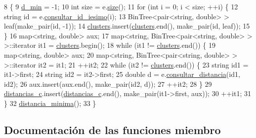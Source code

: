 \begin{DoxyCode}
8                                                 \{
9   \hyperlink{class_cjt___clusters_a1b94b5f25778ee95796a9be966f1c619}{d\_min} = -1;
10   \textcolor{keywordtype}{int} size = e.\hyperlink{class_cjt___especies_a7061cb2108f9be2b12b8f2c5ae99a82d}{size}();
11   \textcolor{keywordflow}{for} (\textcolor{keywordtype}{int} i = 0; i < size; ++i) \{
12     \textcolor{keywordtype}{string} \textcolor{keywordtype}{id} = e.\hyperlink{class_cjt___especies_a0cc233873c53e5120cd362de7821eb16}{consultar\_id\_iesimo}(i);
13     BinTree<pair<string, double> > leaf(make\_pair(\textcolor{keywordtype}{id}, -1));
14     \hyperlink{class_cjt___clusters_a866c5a14f8f50598be2af9fd8c115dd2}{clusters}.insert(\hyperlink{class_cjt___clusters_a866c5a14f8f50598be2af9fd8c115dd2}{clusters}.end(), make\_pair(\textcolor{keywordtype}{id}, leaf));
15   \}
16   map<string, double> aux;
17   map<string, BinTree<pair<string, double> > >::iterator it1 = \hyperlink{class_cjt___clusters_a866c5a14f8f50598be2af9fd8c115dd2}{clusters}.begin();
18   \textcolor{keywordflow}{while} (it1 != \hyperlink{class_cjt___clusters_a866c5a14f8f50598be2af9fd8c115dd2}{clusters}.end()) \{
19     map<string, double> aux;
20     map<string, BinTree<pair<string, double> > >::iterator it2 = it1;
21     ++it2;
22     \textcolor{keywordflow}{while} (it2 != \hyperlink{class_cjt___clusters_a866c5a14f8f50598be2af9fd8c115dd2}{clusters}.end()) \{
23       \textcolor{keywordtype}{string} id1 = it1->first;
24       \textcolor{keywordtype}{string} id2 = it2->first;
25       \textcolor{keywordtype}{double} d = e.\hyperlink{class_cjt___especies_a55f41bd03feccf515a491abca95bd60f}{consultar\_distancia}(id1, id2);
26       aux.insert(aux.end(), make\_pair(id2, d));
27       ++it2;
28     \}
29     \hyperlink{class_cjt___clusters_a2b912c7987fd370bdeaf5dabb966240f}{distancias\_c}.insert(\hyperlink{class_cjt___clusters_a2b912c7987fd370bdeaf5dabb966240f}{distancias\_c}.end(), make\_pair(it1->first, aux));
30     ++it1;
31   \}
32   \hyperlink{class_cjt___clusters_ac0e4dd151f0bbd2954d44551330a8757}{distancia\_minima}();
33 \}
\end{DoxyCode}


\subsection{Documentación de las funciones miembro}
\mbox{\label{class_cjt___clusters_a4675196f92740eda90fcbdf7942ee04b}} 
